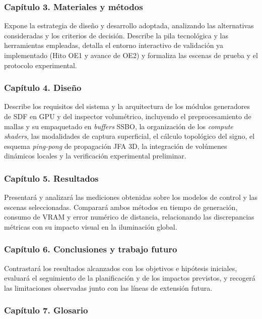 \subsubsection{Capítulo 3. Materiales y métodos}

Expone la estrategia de diseño y desarrollo adoptada, analizando las alternativas consideradas y los criterios de decisión. Describe la pila tecnológica y las herramientas empleadas, detalla el entorno interactivo de validación ya implementado (Hito OE1 y avance de OE2) y formaliza las escenas de prueba y el protocolo experimental.

\subsubsection{Capítulo 4. Diseño}

Describe los requisitos del sistema y la arquitectura de los módulos generadores de SDF en GPU y del inspector volumétrico, incluyendo el preprocesamiento de mallas y su empaquetado en \textit{buffers} SSBO, la organización de los \textit{compute shaders}, las modalidades de captura superficial, el cálculo topológico del signo, el esquema \textit{ping-pong} de propagación JFA 3D, la integración de volúmenes dinámicos locales y la verificación experimental preliminar.

\subsubsection{Capítulo 5. Resultados}

Presentará y analizará las mediciones obtenidas sobre los modelos de control y las escenas seleccionadas. Comparará ambos métodos en tiempo de generación, consumo de VRAM y error numérico de distancia, relacionando las discrepancias métricas con su impacto visual en la iluminación global.

\subsubsection{Capítulo 6. Conclusiones y trabajo futuro}

Contrastará los resultados alcanzados con los objetivos e hipótesis iniciales, evaluará el seguimiento de la planificación y de los impactos previstos, y recogerá las limitaciones observadas junto con las líneas de extensión futura.

\subsubsection{Capítulo 7. Glosario}

